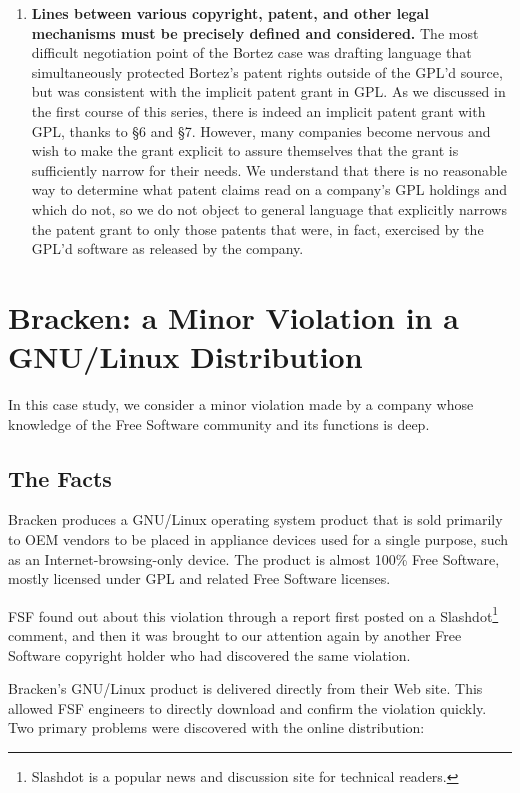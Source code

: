 {\begin{enumerate}
\item {\bf Lines between various copyright, patent, and other legal
  mechanisms must be precisely defined and considered.}  The most
  difficult negotiation point of the Bortez case was drafting language
  that simultaneously protected Bortez's patent rights outside of the
  GPL'd source, but was consistent with the implicit patent grant in
  GPL\@. As we discussed in the first course of this series, there is
  indeed an implicit patent grant with GPL, thanks to \S 6 and \S 7.
  However, many companies become nervous and wish to make the grant
  explicit to assure themselves that the grant is sufficiently narrow for
  their needs. We understand that there is no reasonable way to determine
  what patent claims read on a company's GPL holdings and which do not, so
  we do not object to general language that explicitly narrows the patent
  grant to only those patents that were, in fact, exercised by the GPL'd
  software as released by the company.

\end{enumerate}

\chapter{Bracken: a Minor Violation in a GNU/Linux Distribution}

In this case study, we consider a minor violation made by a company whose
knowledge of the Free Software community and its functions is deep.

\section{The Facts} 

Bracken produces a GNU/Linux operating system product that is sold
primarily to OEM vendors to be placed in appliance devices used for a
single purpose, such as an Internet-browsing-only device. The product
is almost 100\% Free Software, mostly licensed under GPL and related
Free Software licenses.

FSF found out about this violation through a report first posted on a
  Slashdot\footnote{Slashdot is a popular news and discussion site for
  technical readers.} comment, and then it was brought to our attention again
  by another Free Software copyright holder who had discovered the
  same violation.

Bracken's GNU/Linux product is delivered directly from their Web site.
This allowed FSF engineers to directly download and confirm the
violation quickly. Two primary problems were discovered with the
online distribution:

}
